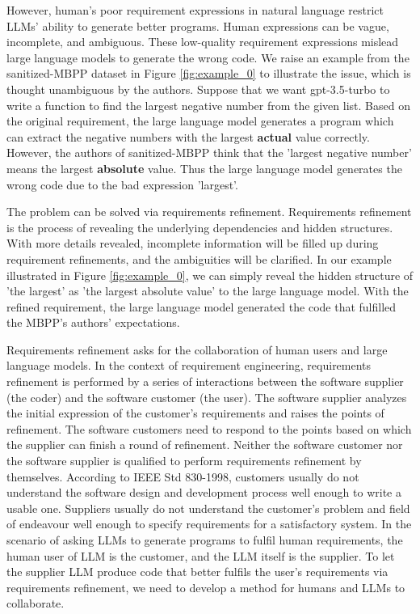 \documentclass[sigconf]{acmart}
\begin{document}
However, human's poor requirement expressions in natural language restrict LLMs' ability to generate better programs. Human expressions can be vague, incomplete, and ambiguous. These low-quality requirement expressions mislead large language models to generate the wrong code. We raise an example from the sanitized-MBPP dataset\cite{mbpp} in Figure \ref{fig:example_0} to illustrate the issue, which is thought unambiguous by the authors. Suppose that we want gpt-3.5-turbo to write a function to find the largest negative number from the given list. Based on the original requirement, the large language model generates a program which can extract the negative numbers with the largest \textbf{actual} value correctly. However, the authors of sanitized-MBPP think that the 'largest negative number' means the largest \textbf{absolute} value. Thus the large language model generates the wrong code due to the bad expression 'largest'.

The problem can be solved via requirements refinement. Requirements refinement is the process of revealing the underlying dependencies and hidden structures\cite{re_framework}. With more details revealed, incomplete information will be filled up during requirement refinements, and the ambiguities will be clarified. In our example illustrated in Figure \ref{fig:example_0}, we can simply reveal the hidden structure of 'the largest' as 'the largest absolute value' to the large language model. With the refined requirement, the large language model generated the code that fulfilled the MBPP's authors' expectations.

Requirements refinement asks for the collaboration of human users and large language models. In the context of requirement engineering, requirements refinement is performed by a series of interactions between the software supplier (the coder) and the software customer (the user). The software supplier analyzes the initial expression of the customer's requirements and raises the points of refinement. The software customers need to respond to the points based on which the supplier can finish a round of refinement. Neither the software customer nor the software supplier is qualified to perform requirements refinement by themselves. According to IEEE Std 830-1998\cite{ieee_re}, customers usually do not understand the software design and development process well enough to write a usable one. Suppliers usually do not understand the customer's problem and field of endeavour well enough to specify requirements for a satisfactory system. In the scenario of asking LLMs to generate programs to fulfil human requirements, the human user of LLM is the customer, and the LLM itself is the supplier. To let the supplier LLM produce code that better fulfils the user's requirements via requirements refinement, we need to develop a method for humans and LLMs to collaborate.
\end{document}
